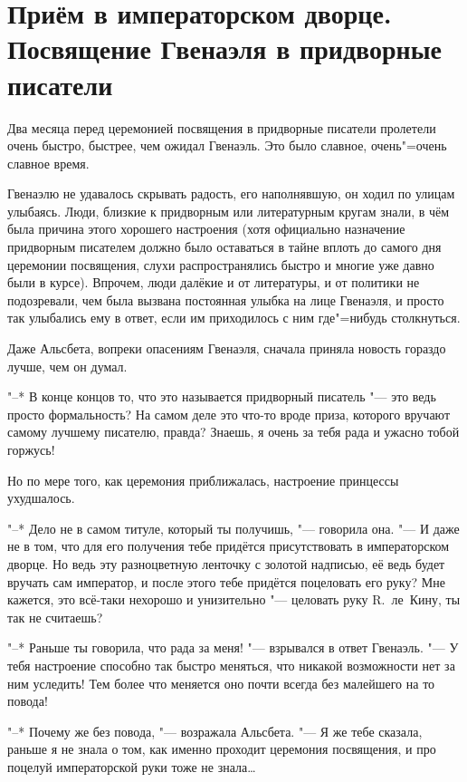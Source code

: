 \section[Приём в императорском дворце]
{Приём в императорском дворце. Посвящение Гвенаэля в придворные писатели}

Два месяца перед церемонией посвящения в придворные писатели пролетели очень
быстро, быстрее, чем ожидал Гвенаэль.
Это было славное, очень"=очень славное время.

Гвенаэлю не удавалось скрывать радость, его наполнявшую, он ходил по улицам
улыбаясь.
Люди, близкие к придворным или литературным кругам знали, в чём была причина
этого хорошего настроения (хотя официально назначение придворным писателем
должно было оставаться в тайне вплоть до самого дня церемонии посвящения, слухи
распространялись быстро и многие уже давно были в курсе).
Впрочем, люди далёкие и от литературы, и от политики не подозревали, чем была
вызвана постоянная улыбка на лице Гвенаэля, и просто так улыбались ему в ответ,
если им приходилось с ним где"=нибудь столкнуться.

Даже Альсбета, вопреки опасениям Гвенаэля, сначала приняла новость гораздо лучше,
чем он думал.

"--* В конце концов то, что это называется придворный писатель "--- это ведь
просто формальность?
На самом деле это что-то вроде приза, которого вручают самому лучшему писателю,
правда?
Знаешь, я очень за тебя рада и ужасно тобой горжусь!

Но по мере того, как церемония приближалась, настроение принцессы ухудшалось.

"--* Дело не в самом титуле, который ты получишь, "--- говорила она.
"--- И даже не в том, что для его получения тебе придётся присутствовать в
императорском дворце.
Но ведь эту разноцветную ленточку с золотой надписью, её ведь будет вручать сам
император, и после этого тебе придётся поцеловать его руку?
Мне кажется, это всё-таки нехорошо и унизительно "--- целовать руку R.~ле~Кину,
ты так не считаешь?

"--* Раньше ты говорила, что рада за меня! "--- взрывался в ответ Гвенаэль.
"--- У тебя настроение способно так быстро меняться, что никакой возможности нет
за ним уследить!
Тем более что меняется оно почти всегда без малейшего на то повода!

"--* Почему же без повода, "--- возражала Альсбета.
"--- Я же тебе сказала, раньше я не знала о том, как именно проходит церемония
посвящения, и про поцелуй императорской руки тоже не знала\ldots

